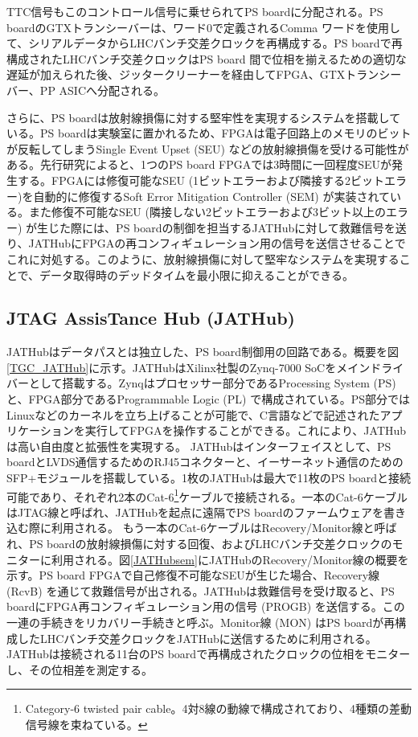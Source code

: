     TTC信号もこのコントロール信号に乗せられてPS boardに分配される。PS boardのGTXトランシーバーは、ワード0で定義されるComma ワードを使用して、シリアルデータからLHCバンチ交差クロックを再構成する。PS boardで再構成されたLHCバンチ交差クロックはPS board 間で位相を揃えるための適切な遅延が加えられた後、ジッタークリーナーを経由してFPGA、GTXトランシーバー、PP ASICへ分配される。    

    さらに、PS boardは放射線損傷に対する堅牢性を実現するシステムを搭載している。PS boardは実験室に置かれるため、FPGAは電子回路上のメモリのビットが反転してしまうSingle Event Upset (SEU) などの放射線損傷を受ける可能性がある。先行研究\cite{PSB_SEU}によると、1つのPS board FPGAでは3時間に一回程度SEUが発生する。FPGAには修復可能なSEU  (1ビットエラーおよび隣接する2ビットエラー)を自動的に修復するSoft Error Mitigation Controller  (SEM) が実装されている。また修復不可能なSEU  (隣接しない2ビットエラーおよび3ビット以上のエラー) が生じた際には、PS boardの制御を担当するJATHubに対して救難信号を送り、JATHubにFPGAの再コンフィギュレーション用の信号を送信させることでこれに対処する。このように、放射線損傷に対して堅牢なシステムを実現することで、データ取得時のデッドタイムを最小限に抑えることができる。    

        \subsection*{JTAG AssisTance Hub (JATHub)}
    JATHubはデータパスとは独立した、PS board制御用の回路である。概要を図\ref{TGC_JATHub}に示す。JATHubはXilinx社製のZynq-7000 SoCをメインドライバーとして搭載する。Zynqはプロセッサー部分であるProcessing System  (PS) と、FPGA部分であるProgrammable Logic  (PL) で構成されている。PS部分ではLinuxなどのカーネルを立ち上げることが可能で、C言語などで記述されたアプリケーションを実行してFPGAを操作することができる。これにより、JATHubは高い自由度と拡張性を実現する。
    JATHubはインターフェイスとして、PS boardとLVDS通信するためのRJ45コネクターと、イーサーネット通信のためのSFP+モジュールを搭載している。1枚のJATHubは最大で11枚のPS boardと接続可能であり、それぞれ2本のCat-6\footnote{Category-6 twisted pair cable。4対8線の動線で構成されており、4種類の差動信号線を束ねている。}ケーブルで接続される。一本のCat-6ケーブルはJTAG線と呼ばれ、JATHubを起点に遠隔でPS boardのファームウェアを書き込む際に利用される。
    もう一本のCat-6ケーブルはRecovery/Monitor線と呼ばれ、PS boardの放射線損傷に対する回復、およびLHCバンチ交差クロックのモニターに利用される。図\ref{JATHubsem}にJATHubのRecovery/Monitor線の概要を示す。PS board FPGAで自己修復不可能なSEUが生じた場合、Recovery線 (RcvB) を通じて救難信号が出される。JATHubは救難信号を受け取ると、PS boardにFPGA再コンフィギュレーション用の信号 (PROGB) を送信する。この一連の手続きをリカバリー手続きと呼ぶ。Monitor線 (MON) はPS boardが再構成したLHCバンチ交差クロックをJATHubに送信するために利用される。JATHubは接続される11台のPS boardで再構成されたクロックの位相をモニターし、その位相差を測定する。
    
